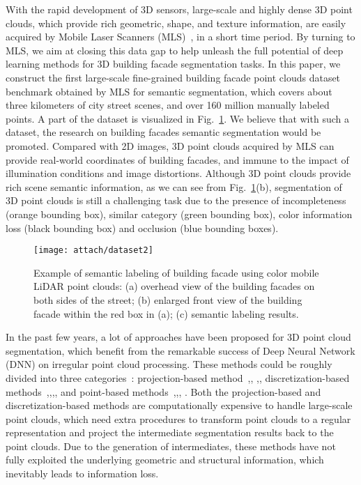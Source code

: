 \documentclass[review]{elsarticle}
\begin{document}
With the rapid development of 3D sensors, large-scale and highly dense 3D point clouds, which provide rich geometric, shape, and texture information, are easily acquired by Mobile Laser Scanners (MLS)~\cite{serna2014paris},\cite{roynard2018paris} in a short time period. By turning to MLS, we aim at closing this data gap to help unleash the full potential of deep learning methods for 3D building facade segmentation tasks. In this paper, we construct the first large-scale fine-grained building facade point clouds dataset benchmark obtained by MLS for semantic segmentation, which covers about three kilometers of city street scenes, and over 160 million manually labeled points. A part of the dataset is visualized in Fig.~\ref{fig:dataset}. We believe that with such a dataset, the research on building facades semantic segmentation would be promoted. Compared with 2D images, 3D point clouds acquired by MLS can provide real-world coordinates of building facades, and immune to the impact of illumination conditions and image distortions. Although 3D point clouds provide rich scene semantic information, as we can see from Fig.~\ref{fig:dataset}(b), segmentation of 3D point clouds is still a challenging task due to the presence of incompleteness (orange bounding box), similar category (green bounding box), color information loss (black bounding box) and occlusion (blue bounding boxes).
\begin{figure}[!t]
	\centering
	\texttt{[image: attach/dataset2]}
	\caption{Example of semantic labeling of building facade using color mobile LiDAR point clouds: (a) overhead view of the building facades on both sides of the street; (b) enlarged front view of the building facade within the red box in (a); (c) semantic labeling results.}
	\label{fig:dataset}
\end{figure}


In the past few years, a lot of approaches have been proposed for 3D point cloud segmentation, which benefit from the remarkable success of Deep Neural Network (DNN) on irregular point cloud processing. These methods could be roughly divided into three categories~\cite{9127813}: projection-based method~\cite{audebert2016semantic},\cite{lawin2017deep}, \cite{tatarchenko2018tangent},\cite{lin2020fpconv}, discretization-based methods~\cite{long2015fully},\cite{huang2016point},\cite{tchapmi2017segcloud},\cite{dai2018scancomplete}, and point-based methods~\cite{qi2017pointnet},\cite{qi2017pointnet++},\cite{zhao2019pointweb}, \cite{hu2020randla}. Both the projection-based and discretization-based methods are computationally expensive to handle large-scale point clouds, which need extra procedures to transform point clouds to a regular representation and project the intermediate segmentation results back to the point clouds. Due to the generation of intermediates, these methods have not fully exploited the underlying geometric and structural information, which inevitably leads to information loss.
\end{document}

